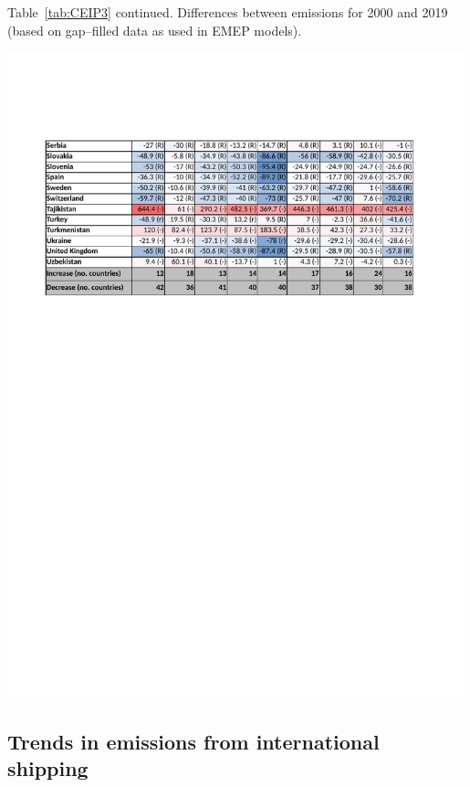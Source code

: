 \begin{table}
  \caption*{Table~\ref{tab:CEIP3} continued. Differences between emissions for 2000 and 2019 (based on gap--filled data as used in EMEP models).}
\centering
{\includegraphics*[viewport=45 520 535 735,clip,width=0.99\textwidth]{FIGS_CEIP/Table3_page2.pdf}}
\label{tab:CEIP3contd}  
\end{table}


\subsection{Trends in emissions from international shipping}
\label{sec:shiptrends}


